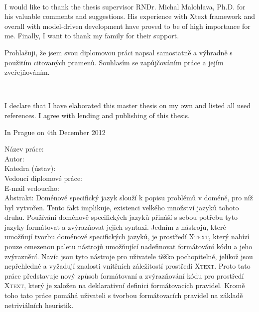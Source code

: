 \documentclass[12pt,notitlepage,a4paper]{report}
\begin{document}
\normalsize
\setcounter{page}{2} %
\ \vspace{10mm} 

\noindent I would like to thank the thesis supervisor RNDr. Michal Malohlava, Ph.D. for his valuable comments and suggestions. His experience with Xtext framework and overall with model-driven development have proved to be of high importance for me. Finally, I want to thank my family for their support.

\vspace{\fill}

\noindent Prohlašuji, že jsem svou diplomovou práci napsal samostatně a výhradně s použitím citovaných pramenů. Souhlasím se zapůjčováním práce a jejím zveřejňováním.

\ \vspace{0mm}

\noindent I declare that I have elaborated this master thesis on my own and listed all used references. I agree with lending and publishing of this thesis.

\bigskip
\noindent In Prague on 4th December 2012 \hspace{\fill}\insertauthor\\ %

\tableofcontents

\newpage

\noindent
Název práce: \inserttitle\\
Autor: \insertauthor\\
Katedra (ústav): \insertdepartment\\
Vedoucí diplomové práce: \insertsupervisor\\
E-mail vedoucího: \insertsupervisorsemail\\

\noindent Abstrakt: Doménově specifický jazyk slouží k popisu problémů v doméně, pro níž byl vytvořen. Tento fakt implikuje, existenci velkého množství jazyků tohoto druhu. Používání doménově specifických jazyků přináší s sebou potřebu tyto jazyky formátovat a zvýrazňovat jejich syntaxi. Jedním z nástrojů, které umožňují tvorbu doménově specifických jazyků, je prostředí \textsc{Xtext}, který nabízí pouze omezenou paletu nástrojů umožňující nadefinovat formátování kódu a jeho zvýraznění. Navíc  jsou tyto nástroje pro uživatele těžko pochopitelné, jelikož jsou nepřehledné a vyžadují znalosti vnitřních záležitostí prostředí \textsc{Xtext}. Proto tato práce představuje nový způsob formátovaní a zvýrazňování kódu pro prostředí  \textsc{Xtext}, který je založen na deklarativní definici formátovacích pravidel. Kromě toho tato práce pomáhá uživateli s tvorbou formátovacích pravidel na základě netriviálních heuristik.
\end{document}

